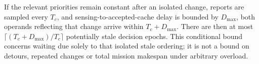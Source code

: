 If the relevant priorities remain constant after an isolated change, reports are sampled every $T_c$, and sensing-to-accepted-cache delay is bounded by $D_{\max}$, both operands reflecting that change arrive within $T_c+D_{\max}$. There are then at most $\lceil(T_c+D_{\max})/T_c\rceil$ potentially stale decision epochs. This conditional bound concerns waiting due solely to that isolated stale ordering; it is not a bound on detours, repeated changes or total mission makespan under arbitrary overload.

